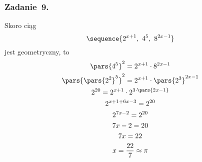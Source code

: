 \subsubsection*{Zadanie~9.}
Skoro ciąg
\begin{equation*}
    \sequence{2^{x + 1},\ 4^5,\ 8^{2x - 1}}
\end{equation*}
jest geometryczny, to
\begin{gather*}
    \pars{4^5}^2 = 2^{x + 1} \cdot 8^{2x - 1}\\
    \pars{\pars{2^2}^5}^2 = 2^{x + 1} \cdot \pars{2^3}^{2x - 1}\\
    2^{20} = 2^{x + 1} \cdot 2^{3 \cdot \pars{2x - 1}}\\
    2^{x + 1 + 6x - 3} = 2^{20}\\
    2^{7x - 2} = 2^{20}\\
    7x - 2 = 20\\
    7x = 22\\
    x = \frac{22}{7} \approx \pi
\end{gather*}
